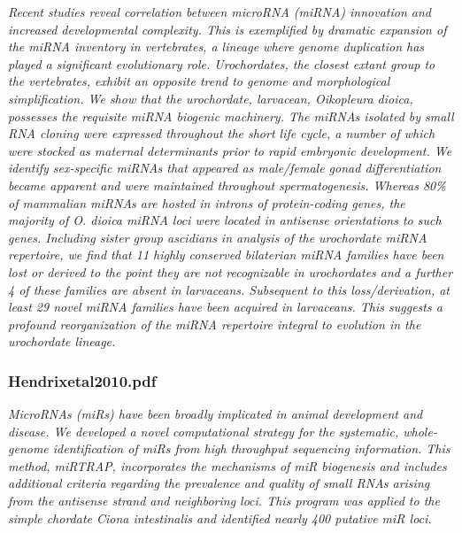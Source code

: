 \documentclass[graybox]{svmult}
\begin{document}
\cite{Fu2008}
\textit{Recent studies reveal correlation between microRNA (miRNA) innovation 
and increased developmental complexity. This is exemplified by dramatic 
expansion of the miRNA inventory in vertebrates, a lineage where genome 
duplication has played a significant evolutionary role. Urochordates, the 
closest extant group to the vertebrates, exhibit an opposite trend to genome and 
morphological simplification. We show that the urochordate, larvacean, 
Oikopleura dioica, possesses the requisite miRNA biogenic machinery. The miRNAs 
isolated by small RNA cloning were expressed throughout the short life cycle, a 
number of which were stocked as maternal determinants prior to rapid embryonic 
development. We identify sex-specific miRNAs that appeared as male/female gonad 
differentiation became apparent and were maintained throughout spermatogenesis. 
Whereas 80{\%} of mammalian miRNAs are hosted in introns of protein-coding 
genes, the majority of O. dioica miRNA loci were located in antisense 
orientations to such genes. Including sister group ascidians in analysis of the 
urochordate miRNA repertoire, we find that 11 highly conserved bilaterian miRNA 
families have been lost or derived to the point they are not recognizable in 
urochordates and a further 4 of these families are absent in larvaceans. 
Subsequent to this loss/derivation, at least 29 novel miRNA families have been 
acquired in larvaceans. This suggests a profound reorganization of the miRNA 
repertoire integral to evolution in the urochordate lineage.}

\subsubsection{Hendrixetal2010.pdf}
\cite{Hendrix2010}
\textit{MicroRNAs (miRs) have been broadly implicated in animal development and 
disease. We developed a novel computational strategy for the systematic, 
whole-genome identification of miRs from high throughput sequencing information. 
This method, miRTRAP, incorporates the mechanisms of miR biogenesis and includes 
additional criteria regarding the prevalence and quality of small RNAs arising 
from the antisense strand and neighboring loci. This program was applied to the 
simple chordate Ciona intestinalis and identified nearly 400 putative miR loci.}
\end{document}
